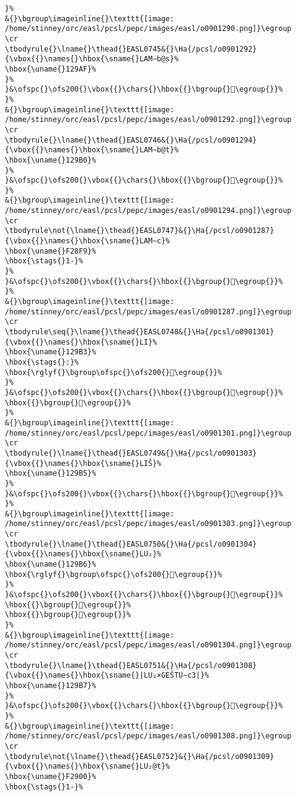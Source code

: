 \begin{verbatim}
}%
&{}\bgroup\imageinline{}\texttt{[image: /home/stinney/orc/easl/pcsl/pepc/images/easl/o0901290.png]}\egroup
\cr
\tbodyrule{}\lname{}\thead{}EASL0745&{}\Ha{/pcsl/o0901292}{\vbox{{}\names{}\hbox{\sname{}LAM∼b@s}%
\hbox{\uname{}129AF}%
}%
}&\ofspc{}\ofs200{}\vbox{{}\chars{}\hbox{{}\bgroup{}𒦯\egroup{}}%
}%
&{}\bgroup\imageinline{}\texttt{[image: /home/stinney/orc/easl/pcsl/pepc/images/easl/o0901292.png]}\egroup
\cr
\tbodyrule{}\lname{}\thead{}EASL0746&{}\Ha{/pcsl/o0901294}{\vbox{{}\names{}\hbox{\sname{}LAM∼b@t}%
\hbox{\uname{}129B0}%
}%
}&\ofspc{}\ofs200{}\vbox{{}\chars{}\hbox{{}\bgroup{}𒦰\egroup{}}%
}%
&{}\bgroup\imageinline{}\texttt{[image: /home/stinney/orc/easl/pcsl/pepc/images/easl/o0901294.png]}\egroup
\cr
\tbodyrule\not{\lname{}\thead{}EASL0747}&{}\Ha{/pcsl/o0901287}{\vbox{{}\names{}\hbox{\sname{}LAM∼c}%
\hbox{\uname{}F28F9}%
\hbox{\stags{}1-}%
}%
}&\ofspc{}\ofs200{}\vbox{{}\chars{}\hbox{{}\bgroup{}󲣹\egroup{}}%
}%
&{}\bgroup\imageinline{}\texttt{[image: /home/stinney/orc/easl/pcsl/pepc/images/easl/o0901287.png]}\egroup
\cr
\tbodyrule\seq{}\lname{}\thead{}EASL0748&{}\Ha{/pcsl/o0901301}{\vbox{{}\names{}\hbox{\sname{}LI}%
\hbox{\uname{}129B3}%
\hbox{\stags{}:}%
\hbox{\rglyf{}\bgroup\ofspc{}\ofs200{}𒦳\egroup{}}%
}%
}&\ofspc{}\ofs200{}\vbox{{}\chars{}\hbox{{}\bgroup{}𒦳\egroup{}}%
\hbox{{}\bgroup{}𒦴\egroup{}}%
}%
&{}\bgroup\imageinline{}\texttt{[image: /home/stinney/orc/easl/pcsl/pepc/images/easl/o0901301.png]}\egroup
\cr
\tbodyrule{}\lname{}\thead{}EASL0749&{}\Ha{/pcsl/o0901303}{\vbox{{}\names{}\hbox{\sname{}LIŠ}%
\hbox{\uname{}129B5}%
}%
}&\ofspc{}\ofs200{}\vbox{{}\chars{}\hbox{{}\bgroup{}𒦵\egroup{}}%
}%
&{}\bgroup\imageinline{}\texttt{[image: /home/stinney/orc/easl/pcsl/pepc/images/easl/o0901303.png]}\egroup
\cr
\tbodyrule{}\lname{}\thead{}EASL0750&{}\Ha{/pcsl/o0901304}{\vbox{{}\names{}\hbox{\sname{}LU₂}%
\hbox{\uname{}129B6}%
\hbox{\rglyf{}\bgroup\ofspc{}\ofs200{}𒦶\egroup{}}%
}%
}&\ofspc{}\ofs200{}\vbox{{}\chars{}\hbox{{}\bgroup{}𒦹\egroup{}}%
\hbox{{}\bgroup{}𒦶\egroup{}}%
\hbox{{}\bgroup{}𒦸\egroup{}}%
}%
&{}\bgroup\imageinline{}\texttt{[image: /home/stinney/orc/easl/pcsl/pepc/images/easl/o0901304.png]}\egroup
\cr
\tbodyrule{}\lname{}\thead{}EASL0751&{}\Ha{/pcsl/o0901308}{\vbox{{}\names{}\hbox{\sname{}|LU₂×GEŠTU∼c3|}%
\hbox{\uname{}129B7}%
}%
}&\ofspc{}\ofs200{}\vbox{{}\chars{}\hbox{{}\bgroup{}𒦷\egroup{}}%
}%
&{}\bgroup\imageinline{}\texttt{[image: /home/stinney/orc/easl/pcsl/pepc/images/easl/o0901308.png]}\egroup
\cr
\tbodyrule\not{\lname{}\thead{}EASL0752}&{}\Ha{/pcsl/o0901309}{\vbox{{}\names{}\hbox{\sname{}LU₂@t}%
\hbox{\uname{}F2900}%
\hbox{\stags{}1-}%

\end{verbatim}
